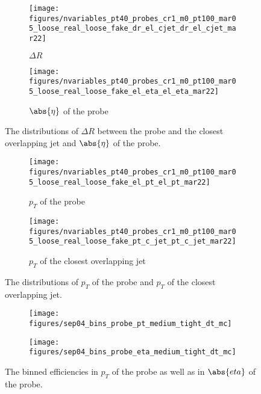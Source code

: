 \begin{figure}[H]
	\begin{subfigure}{0.5\textwidth}
		\texttt{[image: figures/nvariables\_pt40\_probes\_cr1\_m0\_pt100\_mar05\_loose\_real\_loose\_fake\_dr\_el\_cjet\_dr\_el\_cjet\_mar22]}
		\label{bfptprobe}
		\caption{$\Delta R $ }
	\end{subfigure}
	\begin{subfigure}{0.5\textwidth}
		\texttt{[image: figures/nvariables\_pt40\_probes\_cr1\_m0\_pt100\_mar05\_loose\_real\_loose\_fake\_el\_eta\_el\_eta\_mar22]}
		\caption{$\abs{\eta}$ of the probe}
	\end{subfigure}

	\centering

	\caption{The distributions of $\Delta R $ between the probe and the closest
		overlapping jet and $\abs{\eta}$ of the probe.}

	\label{f:bins01}
\end{figure}

\begin{figure}
	\begin{subfigure}{0.5\textwidth}
		\texttt{[image: figures/nvariables\_pt40\_probes\_cr1\_m0\_pt100\_mar05\_loose\_real\_loose\_fake\_el\_pt\_el\_pt\_mar22]}
		\caption{$p_T$ of the probe}
	\end{subfigure}
	\begin{subfigure}{0.5\textwidth}
		\texttt{[image: figures/nvariables\_pt40\_probes\_cr1\_m0\_pt100\_mar05\_loose\_real\_loose\_fake\_pt\_c\_jet\_pt\_c\_jet\_mar22]}
		\caption{$p_T$ of the closest overlapping jet}
	\end{subfigure}

	\centering

	\caption{The distributions of $p_T$ of the probe and $p_T$ of the closest
		overlapping jet.}

	\label{f:bins02}
\end{figure}


\begin{figure}[H]
	\begin{subfigure}{0.5\textwidth}
		\texttt{[image: figures/sep04\_bins\_probe\_pt\_medium\_tight\_dt\_mc]}
	\end{subfigure}
	\begin{subfigure}{0.5\textwidth}
		\texttt{[image: figures/sep04\_bins\_probe\_eta\_medium\_tight\_dt\_mc]}
	\end{subfigure}

	\centering
	\caption{The binned efficiencies in $p_T$ of the probe as well as in $\abs{eta}$ of the
		probe.}
	\label{f:binspt01}
\end{figure}

